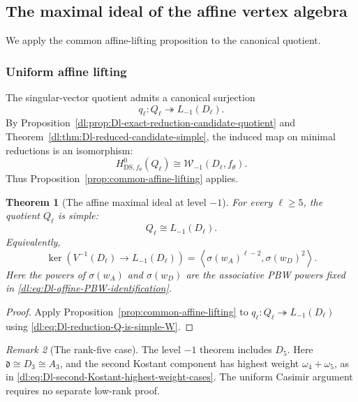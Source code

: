\documentclass[11pt,reqno]{amsart}
\newtheorem{theorem}{Theorem}[section]
\theoremstyle{definition}
\theoremstyle{remark}
\newtheorem{remark}[theorem]{Remark}
\begin{document}
\subsection{The maximal ideal of the affine vertex algebra}


We apply the common affine-lifting proposition to the canonical quotient.

\subsubsection{Uniform affine lifting}


The singular-vector quotient admits a canonical surjection
\begin{equation*}
 q_\ell:Q_\ell\twoheadrightarrow L_{-1}(D_\ell).
\end{equation*}
By Proposition~\ref{dl:prop:Dl-exact-reduction-candidate-quotient} and
Theorem~\ref{dl:thm:Dl-reduced-candidate-simple}, the induced map on minimal
reductions is an isomorphism:
\begin{equation}
 H^0_{\mathrm{DS},f_\theta}(Q_\ell)
 \cong\mathcal W_{-1}(D_\ell,f_\theta).
 \label{dl:eq:Dl-reduction-Q-is-simple-W}
\end{equation}
Thus Proposition~\ref{prop:common-affine-lifting} applies.

\begin{theorem}[The affine maximal ideal at level \(-1\)]
\label{dl:thm:Dl-main-maximal-ideal}
For every \(\ell\ge5\), the quotient \(Q_\ell\) is simple:
\begin{equation*}
  Q_\ell\cong L_{-1}(D_\ell).
\end{equation*}
Equivalently,
\begin{equation*}
  \ker\!\left(
    V^{-1}(D_\ell)
    \longrightarrow
    L_{-1}(D_\ell)
  \right)
  =
  \left\langle
    \sigma(w_A)^{\ell-2},
    \sigma(w_D)^2
  \right\rangle.
\end{equation*}
Here the powers of \(\sigma(w_A)\) and \(\sigma(w_D)\) are the
associative PBW powers fixed in
\eqref{dl:eq:Dl-affine-PBW-identification}.
\end{theorem}

\begin{proof}
Apply Proposition~\ref{prop:common-affine-lifting} to
$q_\ell:Q_\ell\twoheadrightarrow L_{-1}(D_\ell)$ using
\eqref{dl:eq:Dl-reduction-Q-is-simple-W}.
\end{proof}

\begin{remark}[The rank-five case]

The level \(-1\) theorem includes \(D_5\).  Here
\(\mathfrak d\cong D_3\cong A_3\), and the second Kostant component has
highest weight \(\omega_4+\omega_5\), as in
\eqref{dl:eq:Dl-second-Kostant-highest-weight-cases}.  The uniform
Casimir argument requires no separate low-rank proof.
\end{remark}
\end{document}
